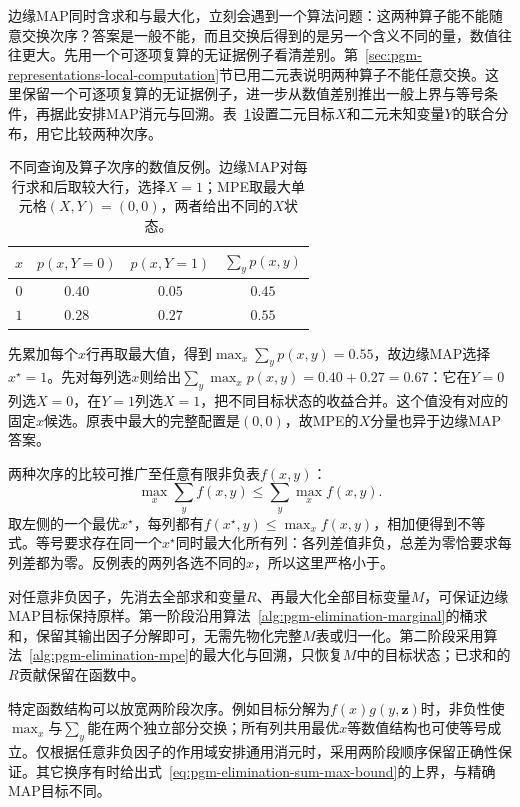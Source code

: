 边缘MAP同时含求和与最大化，立刻会遇到一个算法问题：这两种算子能不能随意交换次序？答案是一般不能，而且交换后得到的是另一个含义不同的量，数值往往更大。先用一个可逐项复算的无证据例子看清差别。第~\ref{sec:pgm-representations-local-computation}节已用二元表说明两种算子不能任意交换。这里保留一个可逐项复算的无证据例子，进一步从数值差别推出一般上界与等号条件，再据此安排MAP消元与回溯。表~\ref{tab:pgm-elimination-map-counterexample}设置二元目标$X$和二元未知变量$Y$的联合分布，用它比较两种次序。

\begin{table}[htbp]
  \centering
  \begin{tabular}{cccc}
    \toprule
    $x$ & $p(x,Y=0)$ & $p(x,Y=1)$ & $\sum_y p(x,y)$\\
    \midrule
    $0$ & $0.40$ & $0.05$ & $0.45$\\
    $1$ & $0.28$ & $0.27$ & $0.55$\\
    \bottomrule
  \end{tabular}
  \caption{不同查询及算子次序的数值反例。边缘MAP对每行求和后取较大行，选择$X=1$；MPE取最大单元格$(X,Y)=(0,0)$，两者给出不同的$X$状态。}
  \label{tab:pgm-elimination-map-counterexample}
\end{table}

先累加每个$x$行再取最大值，得到$\max_x\sum_y p(x,y)=0.55$，故边缘MAP选择$x^\star=1$。先对每列选$x$则给出$\sum_y\max_x p(x,y)=0.40+0.27=0.67$：它在$Y=0$列选$X=0$，在$Y=1$列选$X=1$，把不同目标状态的收益合并。这个值没有对应的固定$x$候选。原表中最大的完整配置是$(0,0)$，故MPE的$X$分量也异于边缘MAP答案。

两种次序的比较可推广至任意有限非负表$f(x,y)$：
\begin{equation}
  \max_x\sum_y f(x,y)
  \leq \sum_y\max_x f(x,y).
  \label{eq:pgm-elimination-sum-max-bound}
\end{equation}
取左侧的一个最优$x^\star$，每列都有$f(x^\star,y)\leq\max_x f(x,y)$，相加便得到不等式。等号要求存在同一个$x^\star$同时最大化所有列：各列差值非负，总差为零恰要求每列差都为零。反例表的两列各选不同的$x$，所以这里严格小于。

对任意非负因子，先消去全部求和变量$R$、再最大化全部目标变量$M$，可保证边缘MAP目标保持原样。第一阶段沿用算法~\ref{alg:pgm-elimination-marginal}的桶求和，保留其输出因子分解即可，无需先物化完整$M$表或归一化。第二阶段采用算法~\ref{alg:pgm-elimination-mpe}的最大化与回溯，只恢复$M$中的目标状态；已求和的$R$贡献保留在函数中。

特定函数结构可以放宽两阶段次序。例如目标分解为$f(x)g(y,\bm{z})$时，非负性使$\max_x$与$\sum_y$能在两个独立部分交换；所有列共用最优$x$等数值结构也可使等号成立。仅根据任意非负因子的作用域安排通用消元时，采用两阶段顺序保留正确性保证。其它换序有时给出式~\eqref{eq:pgm-elimination-sum-max-bound}的上界，与精确MAP目标不同。

